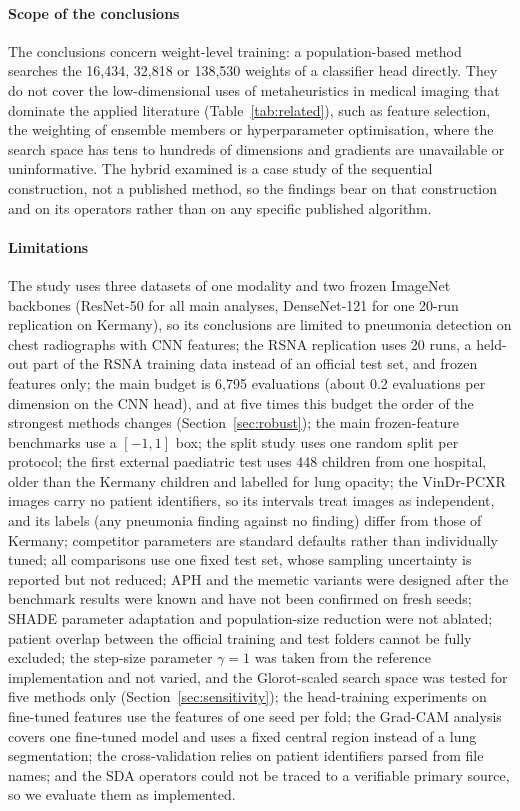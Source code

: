 \documentclass[preprint,12pt]{elsarticle}
\begin{document}
\paragraph{Scope of the conclusions} The conclusions concern weight-level training: a population-based method searches the 16,434, 32,818 or 138,530 weights of a classifier head directly. They do not cover the low-dimensional uses of metaheuristics in medical imaging that dominate the applied literature (Table~\ref{tab:related}), such as feature selection, the weighting of ensemble members or hyperparameter optimisation, where the search space has tens to hundreds of dimensions and gradients are unavailable or uninformative. The hybrid examined is a case study of the sequential construction, not a published method, so the findings bear on that construction and on its operators rather than on any specific published algorithm.

\paragraph{Limitations} The study uses three datasets of one modality and two frozen ImageNet backbones (ResNet-50 for all main analyses, DenseNet-121 for one 20-run replication on Kermany), so its conclusions are limited to pneumonia detection on chest radiographs with CNN features; the RSNA replication uses 20 runs, a held-out part of the RSNA training data instead of an official test set, and frozen features only; the main budget is 6,795 evaluations (about 0.2 evaluations per dimension on the CNN head), and at five times this budget the order of the strongest methods changes (Section~\ref{sec:robust}); the main frozen-feature benchmarks use a $[-1,1]$ box; the split study uses one random split per protocol; the first external paediatric test uses 448 children from one hospital, older than the Kermany children and labelled for lung opacity; the VinDr-PCXR images carry no patient identifiers, so its intervals treat images as independent, and its labels (any pneumonia finding against no finding) differ from those of Kermany; competitor parameters are standard defaults rather than individually tuned; all comparisons use one fixed test set, whose sampling uncertainty is reported but not reduced; APH and the memetic variants were designed after the benchmark results were known and have not been confirmed on fresh seeds; SHADE parameter adaptation and population-size reduction were not ablated; patient overlap between the official training and test folders cannot be fully excluded; the step-size parameter $\gamma=1$ was taken from the reference implementation and not varied, and the Glorot-scaled search space was tested for five methods only (Section~\ref{sec:sensitivity}); the head-training experiments on fine-tuned features use the features of one seed per fold; the Grad-CAM analysis covers one fine-tuned model and uses a fixed central region instead of a lung segmentation; the cross-validation relies on patient identifiers parsed from file names; and the SDA operators could not be traced to a verifiable primary source, so we evaluate them as implemented.
\end{document}
